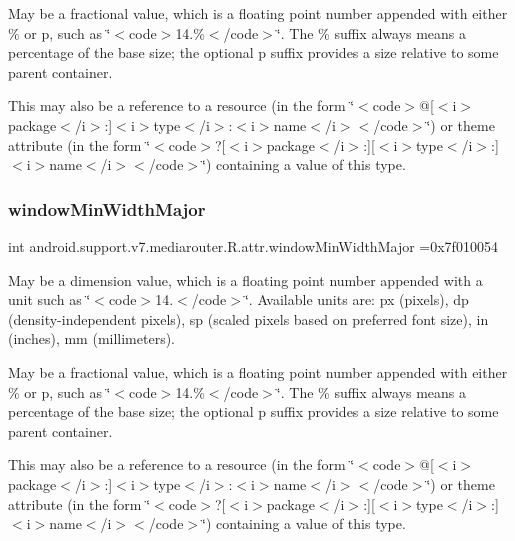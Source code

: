 May be a fractional value, which is a floating point number appended with either \% or p, such as \char`\"{}$<$code$>$14.\%$<$/code$>$\char`\"{}. The \% suffix always means a percentage of the base size; the optional p suffix provides a size relative to some parent container. 

This may also be a reference to a resource (in the form \char`\"{}$<$code$>$@\mbox{[}$<$i$>$package$<$/i$>$\+:\mbox{]}$<$i$>$type$<$/i$>$\+:$<$i$>$name$<$/i$>$$<$/code$>$\char`\"{}) or theme attribute (in the form \char`\"{}$<$code$>$?\mbox{[}$<$i$>$package$<$/i$>$\+:\mbox{]}\mbox{[}$<$i$>$type$<$/i$>$\+:\mbox{]}$<$i$>$name$<$/i$>$$<$/code$>$\char`\"{}) containing a value of this type. \mbox{\label{classandroid_1_1support_1_1v7_1_1mediarouter_1_1R_1_1attr_a705a5811e50f04b35af963dead610055}} 
\subsubsection{\texorpdfstring{window\+Min\+Width\+Major}{windowMinWidthMajor}}
{\footnotesize\ttfamily int android.\+support.\+v7.\+mediarouter.\+R.\+attr.\+window\+Min\+Width\+Major =0x7f010054\hspace{0.3cm}{\ttfamily [static]}}

May be a dimension value, which is a floating point number appended with a unit such as \char`\"{}$<$code$>$14.\+5sp$<$/code$>$\char`\"{}. Available units are\+: px (pixels), dp (density-\/independent pixels), sp (scaled pixels based on preferred font size), in (inches), mm (millimeters). 

May be a fractional value, which is a floating point number appended with either \% or p, such as \char`\"{}$<$code$>$14.\%$<$/code$>$\char`\"{}. The \% suffix always means a percentage of the base size; the optional p suffix provides a size relative to some parent container. 

This may also be a reference to a resource (in the form \char`\"{}$<$code$>$@\mbox{[}$<$i$>$package$<$/i$>$\+:\mbox{]}$<$i$>$type$<$/i$>$\+:$<$i$>$name$<$/i$>$$<$/code$>$\char`\"{}) or theme attribute (in the form \char`\"{}$<$code$>$?\mbox{[}$<$i$>$package$<$/i$>$\+:\mbox{]}\mbox{[}$<$i$>$type$<$/i$>$\+:\mbox{]}$<$i$>$name$<$/i$>$$<$/code$>$\char`\"{}) containing a value of this type. \mbox{\label{classandroid_1_1support_1_1v7_1_1mediarouter_1_1R_1_1attr_acdc05eee53f13576d9e2e5bfd4295487}} 

